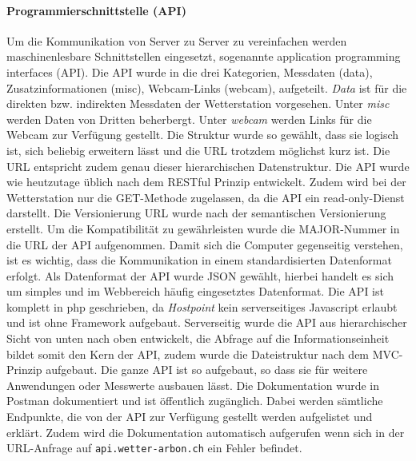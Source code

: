 \documentclass[10pt]{article}
\begin{document}
\begin{multicols}{2}
\paragraph{Programmierschnittstelle (API)}
Um die Kommunikation von Server zu Server zu vereinfachen werden maschinenlesbare Schnittstellen eingesetzt, sogenannte application programming interfaces (API). Die API wurde in die drei Kategorien, Messdaten (data), Zusatzinformationen (misc), Webcam-Links (webcam), aufgeteilt. \emph{Data} ist für die direkten bzw. indirekten Messdaten der Wetterstation vorgesehen. Unter \emph{misc} werden Daten von Dritten beherbergt. Unter \emph{webcam} werden Links für die Webcam zur Verfügung gestellt. Die Struktur wurde so gewählt, dass sie logisch ist, sich beliebig erweitern lässt und die URL trotzdem möglichst kurz ist. Die URL entspricht zudem genau dieser hierarchischen Datenstruktur. Die API wurde wie heutzutage üblich nach dem RESTful Prinzip entwickelt. Zudem wird bei der Wetterstation nur die GET-Methode zugelassen, da die API ein read-only-Dienst darstellt. Die Versionierung URL wurde nach der semantischen Versionierung erstellt. Um die Kompatibilität zu gewährleisten wurde die MAJOR-Nummer in die URL der API aufgenommen. Damit sich die Computer gegenseitig verstehen, ist es wichtig, dass die Kommunikation in einem standardisierten Datenformat erfolgt. Als Datenformat der API wurde JSON gewählt, hierbei handelt es sich um simples und im Webbereich häufig eingesetztes Datenformat. Die API ist komplett in php geschrieben, da \textit{Hostpoint} kein serverseitiges Javascript erlaubt und ist ohne Framework aufgebaut. Serverseitig wurde die API aus hierarchischer Sicht von unten nach oben entwickelt, die Abfrage auf die Informationseinheit bildet somit den Kern der API, zudem wurde die Dateistruktur nach dem MVC-Prinzip aufgebaut. Die ganze API ist so aufgebaut, so dass sie für weitere Anwendungen oder Messwerte ausbauen lässt. Die Dokumentation wurde in Postman dokumentiert und ist öffentlich zugänglich. Dabei werden sämtliche Endpunkte, die von der API zur Verfügung gestellt werden aufgelistet und erklärt. Zudem wird die Dokumentation automatisch aufgerufen wenn sich in der URL-Anfrage auf \texttt{api.wetter-arbon.ch} ein Fehler befindet.

\end{multicols}
\end{document}

